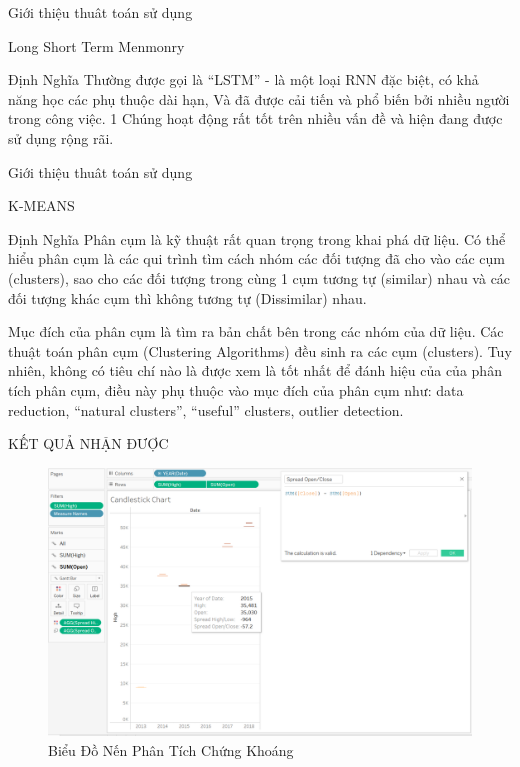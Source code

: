 \documentclass[10pt]{beamer}
\begin{document}
\begin{frame}{Giới thiệu thuât toán sử dụng}
   \begin{block}{Long Short Term Menmonry}
   \begin{block} {Định Nghĩa}
    Thường được gọi là “LSTM” - là một loại RNN đặc biệt, có khả năng học các phụ thuộc dài hạn, Và đã được cải tiến và phổ biến bởi nhiều người trong công việc. 1 Chúng hoạt động rất tốt trên nhiều vấn đề và hiện đang được sử dụng rộng rãi.
   \end{block}
   \end{block}

\end{frame}

\begin{frame}{Giới thiệu thuât toán sử dụng}
   \begin{block}{K-MEANS}
   \begin{block} {Định Nghĩa}
Phân cụm là kỹ thuật rất quan trọng trong khai phá dữ liệu. Có thể hiểu phân cụm là các qui trình tìm cách nhóm các đối tượng đã cho vào các cụm (clusters), sao cho các đối tượng trong cùng 1 cụm tương tự (similar) nhau và các đối tượng khác cụm thì không tương tự (Dissimilar) nhau.

Mục đích của phân cụm là tìm ra bản chất bên trong các nhóm của dữ liệu. Các thuật toán phân cụm (Clustering Algorithms) đều sinh ra các cụm (clusters). Tuy nhiên, không có tiêu chí nào là được xem là tốt nhất để đánh hiệu của của phân tích phân cụm, điều này phụ thuộc vào mục đích của phân cụm như: data reduction, “natural clusters”, “useful” clusters, outlier detection.
   \end{block}
   \end{block}

\end{frame}

\begin{frame}{KẾT QUẢ NHẬN ĐƯỢC}
\begin{center}
    \begin{figure}[htp]
    \begin{center}
     \includegraphics[scale=.20]{BDNen PTCK.png}
    \end{center}
    \caption{Biểu Đồ Nến Phân Tích Chứng Khoáng}
    \label{Biểu Đồ Nến Phân Tích Chứng Khoáng}
    \end{figure}
\end{center}
\end{frame}
 
\end{document}
